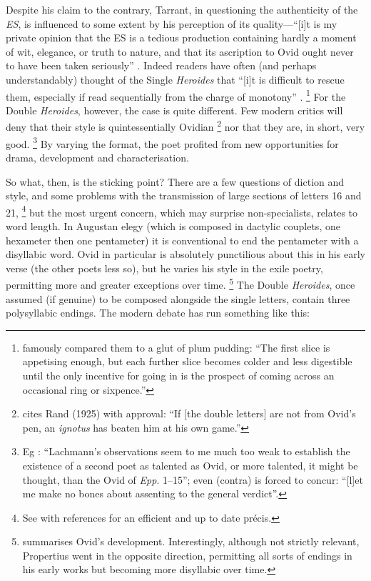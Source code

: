 \documentclass[twocolumn, switch, a4paper]{article} %
\begin{document}
Despite his claim to the contrary, Tarrant, in questioning the authenticity of
the \emph{ES}, is influenced to some extent by his perception of its
quality---``[i]t is my private opinion that the ES is a tedious production
containing hardly a moment of wit, elegance, or truth to nature, and that its
ascription to Ovid ought never to have been taken seriously''
\cite[134--5]{tarrant_81}. Indeed readers have often (and perhaps
understandably) thought of the Single \emph{Heroides} that ``[i]t is difficult
to rescue them, especially if read sequentially from the charge of monotony''
\cite[1]{kenney_96}.%
%
    \footnote{ famously compared them to a glut of
    plum pudding: ``The first slice is appetising enough, but each further
    slice becomes colder and less digestible until the only incentive for
    going in is the prospect of coming across an occasional ring or
    sixpence.''}
%
For the Double \emph{Heroides}, however, the case is quite different. Few
modern critics will deny that their style is quintessentially Ovidian%
%
    \footnote{ cites Rand (1925) with approval: ``If [the
    double letters] are not from Ovid's pen, an \emph{ignotus} has beaten him
    at his own game.''}
%
nor that they are, in short, very good.%
%
    \footnote{Eg : ``Lachmann's observations
    seem to me much too weak to establish the existence of a second poet as
    talented as Ovid, or more talented, it might be thought, than the Ovid of
    \emph{Epp}. 1--15''; even  (contra) is forced to
    concur: ``[l]et me make no bones about assenting to the general
    verdict''.}
%
By varying the format, the poet profited from new opportunities for drama,
development and characterisation.

So what, then, is the sticking point? There are a few questions of diction and
style, and some problems with the transmission of large sections of letters 16
and 21,%
%
    \footnote{See  with references for an
    efficient and up to date précis.}
%
but the most urgent concern, which may surprise non-specialists, relates to
word length. In Augustan elegy (which is composed in dactylic couplets, one
hexameter then one pentameter) it is conventional to end the pentameter with a
disyllabic word. Ovid in particular is absolutely punctilious about this in
his early verse (the other poets less so), but he varies his style in the
exile poetry, permitting more and greater exceptions over time.%
%
    \footnote{ summarises Ovid's development.
    Interestingly, although not strictly relevant, Propertius went in the
    opposite direction, permitting all sorts of endings in his early works but
    becoming more disyllabic over time.}
%
The Double \emph{Heroides}, once assumed (if genuine) to be composed
alongside the single letters, contain three polysyllabic endings. The
modern debate has run something like this:
\end{document}
